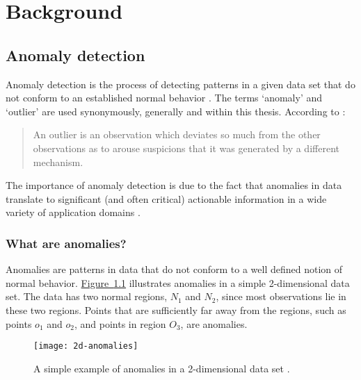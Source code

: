 \chapter{Background}
\label{ch:background}

\section{Anomaly detection}
\label{sec:anomalyDetection}
Anomaly detection is the process of detecting patterns in a given data set that 
do not conform to an established normal behavior \cite{Chandola:2007}. The terms
`anomaly' and `outlier' are used synonymously, generally and within this thesis.
According to \citeauthor{Hawkins:1980} \cite{Hawkins:1980}:

\begin{quote}
An outlier is an observation which deviates so much from the other observations 
as to arouse suspicions that it was generated by a different mechanism.
\end{quote}

The importance of anomaly detection is due to the fact that anomalies in data
translate to significant (and often critical) actionable information in a wide 
variety of application domains \cite{Chandola:2007}.

\subsection{What are anomalies?}
\label{sec:whatAreAnomalies}
Anomalies are patterns in data that do not conform to a well defined notion of
normal behavior. \hyperref[fig:2d-anomalies]{Figure~\ref{fig:2d-anomalies}} 
illustrates anomalies in a simple 2-dimensional data set. The data has two 
normal regions, $N_{1}$ and $N_{2}$, since most observations lie in these two 
regions. Points that are sufficiently far away from the regions, such as points 
$o_{1}$ and $o_{2}$, and points in region $O_{3}$, are anomalies.

\begin{figure}
\centering
\texttt{[image: 2d-anomalies]}
\caption{A simple example of anomalies in a 2-dimensional data set 
\cite{Chandola:2007}.}
\label{fig:2d-anomalies}
\end{figure}


